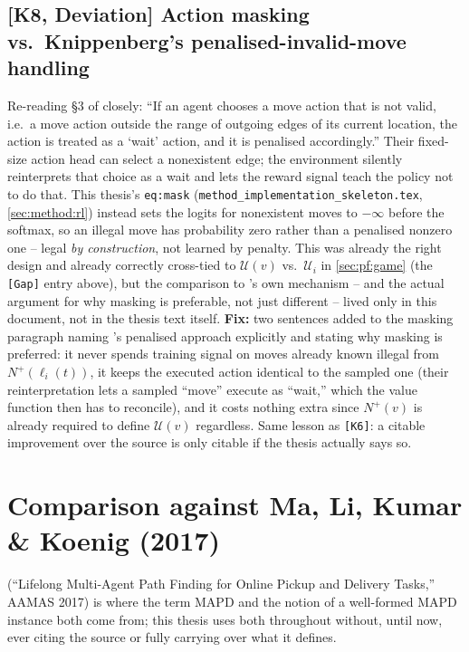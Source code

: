 \documentclass[11pt]{article}
\begin{document}
\subsection*{[K8, Deviation] Action masking vs.\ Knippenberg's penalised-invalid-move handling}
Re-reading \S3 of \citeauthor{knippenberg2021} closely: ``If an agent chooses
a move action that is not valid, i.e.\ a move action outside the range of
outgoing edges of its current location, the action is treated as a `wait'
action, and it is penalised accordingly.'' Their fixed-size action head can
select a nonexistent edge; the environment silently reinterprets that choice
as a wait and lets the reward signal teach the policy not to do that. This
thesis's \texttt{eq:mask} (\texttt{method\_implementation\_skeleton.tex},
\ref{sec:method:rl}) instead sets the logits for nonexistent moves to
$-\infty$ before the softmax, so an illegal move has probability zero rather
than a penalised nonzero one -- legal \emph{by construction}, not learned by
penalty. This was already the right design and already correctly cross-tied
to $\mathcal{U}(v)$ vs.\ $\mathcal{U}_i$ in \ref{sec:pf:game} (the
\texttt{[Gap]} entry above), but the comparison to
\citeauthor{knippenberg2021}'s own mechanism -- and the actual argument for
why masking is preferable, not just different -- lived only in this
document, not in the thesis text itself. \textbf{Fix:} two sentences added
to the masking paragraph naming \citet{knippenberg2021}'s penalised
approach explicitly and stating why masking is preferred: it never spends
training signal on moves already known illegal from $N^{+}(\ell_i(t))$, it
keeps the executed action identical to the sampled one (their reinterpretation
lets a sampled ``move'' execute as ``wait,'' which the value function then
has to reconcile), and it costs nothing extra since $N^{+}(v)$ is already
required to define $\mathcal{U}(v)$ regardless. Same lesson as \texttt{[K6]}:
a citable improvement over the source is only citable if the thesis actually
says so.

\section{Comparison against Ma, Li, Kumar \& Koenig (2017)}
\label{sec:ma2017}

\citet{ma2017lifelong} (``Lifelong Multi-Agent Path Finding for Online
Pickup and Delivery Tasks,'' AAMAS 2017) is where the term MAPD and the
notion of a well-formed MAPD instance both come from; this thesis uses both
throughout without, until now, ever citing the source or fully carrying over
what it defines.
\end{document}
